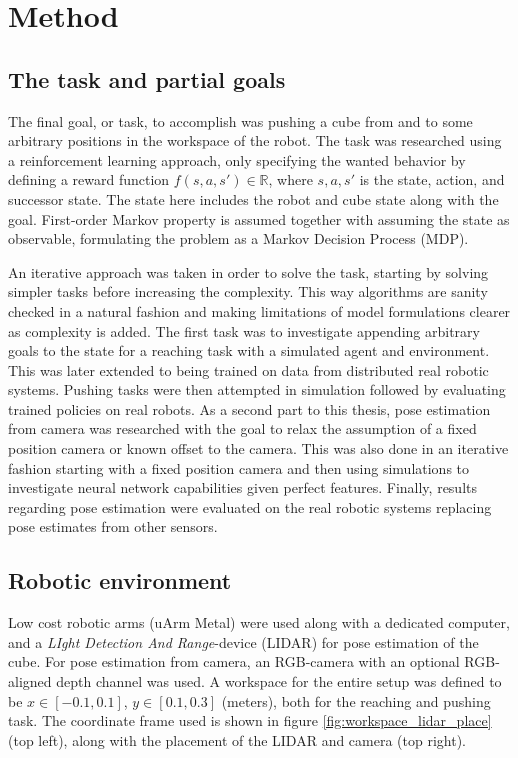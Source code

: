 \section{Method}

\subsection{The task and partial goals}

The final goal, or task, to accomplish was pushing a cube from and to some
arbitrary positions in the workspace of the robot. The task was researched
using a reinforcement learning approach, only specifying the wanted behavior by
defining a reward function $f(s, a, s') \in \mathbb{R}$, where $s, a, s'$ is
the state, action, and successor state. The state here includes the robot and
cube state along with the goal. First-order Markov property is assumed together
with assuming the state as observable, formulating the problem as a Markov
Decision Process (MDP).

An iterative approach was taken in order to solve the
task, starting by solving simpler tasks before increasing the complexity. This
way algorithms are sanity checked in a natural fashion and making limitations
of model formulations clearer as complexity is added. The first task was to
investigate appending arbitrary goals to the state for a reaching task with a
simulated agent and environment. This was later extended to being trained on
data from distributed real robotic systems. Pushing tasks were then attempted
in simulation followed by evaluating trained policies on real robots. As a
second part to this thesis, pose estimation from camera was researched with the
goal to relax the assumption of a fixed position camera or known offset to the
camera. This was also done in an iterative fashion starting with a fixed
position camera and then using simulations to investigate neural network
capabilities given perfect features. Finally, results regarding pose estimation
were evaluated on the real robotic systems replacing pose estimates from other
sensors.

\subsection{Robotic environment}
\label{sec:robo_env}

Low cost robotic arms (uArm Metal) were used along with a dedicated computer,
and a \textit{LIght Detection And Range}-device (LIDAR) for pose estimation of
the cube. For pose estimation from camera, an RGB-camera with an optional
RGB-aligned depth channel was used. A workspace for the entire setup was
defined to be $x \in [-0.1, 0.1]$, $y \in [0.1, 0.3]$ (meters), both for the
reaching and pushing task. The coordinate frame used is shown in figure
\ref{fig:workspace_lidar_place} (top left), along with the placement of the
LIDAR and camera (top right).

